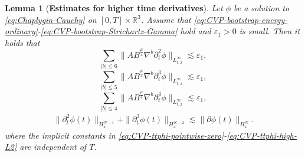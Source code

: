 \documentclass[11pt,twoside]{article}
\def\f{\frac}
\def\p{\partial}
\def\ve{\varepsilon}
\def\ls{\lesssim}
\theoremstyle{plain}
\newtheorem{lemma}[theorem]{Lemma}
\theoremstyle{definition}
\theoremstyle{assumption}
\numberwithin{equation}{section}
\begin{document}
	
	\begin{lemma}[{\bf Estimates for higher time derivatives}]
		\label{lem:CVP-higher-time-derivative-estimates}
		Let \(\phi\) be a solution to \eqref{eq:Chaplygin-Cauchy}
		on \([0,T]\times\mathbb R^3\).
		Assume that
		\eqref{eq:CVP-bootstrap-energy-ordinary}-\eqref{eq:CVP-bootstrap-Strichartz-Gamma} hold and
		$\ve_1>0$ is small. Then it holds that
		\begin{equation}
			\label{eq:CVP-ttphi-pointwise-zero}
			\sum_{|b|\le 6}\|AB^{\f\mu4}\nabla^b\p_t^2\phi\|_{L^\infty_{t,x}}
			\ls
			\ve_1,
		\end{equation}
		\begin{equation}
			\label{eq:CVP-ttphi-low-pointwise}
			\sum_{|b|\le 5}\|AB^{\f\mu4}\nabla^b\p_t^3\phi\|_{L^\infty_{t,x}}
			\ls
			\ve_1,
		\end{equation}
		\begin{equation}
			\label{eq:CVP-ttphi-low-pointwise-2}
			\sum_{|b|\le 4}\|AB^{\f\mu4}\nabla^b\p_t^4\phi\|_{L^\infty_{t,x}}
			\ls
			\ve_1,
		\end{equation}
		\begin{equation}
			\label{eq:CVP-ttphi-high-L2}
			\begin{aligned}
				\|\p_t^2\phi(t)\|_{H^{N-1}_x}
				+
				\|\p_t^3\phi(t)\|_{H^{N-2}_x}
				\ls
				\|\p\phi(t)\|_{H^N_x}.
			\end{aligned}
		\end{equation}
	where the implicit constants in \eqref{eq:CVP-ttphi-pointwise-zero}-\eqref{eq:CVP-ttphi-high-L2} are independent of $T$.
	\end{lemma}
\end{document}

